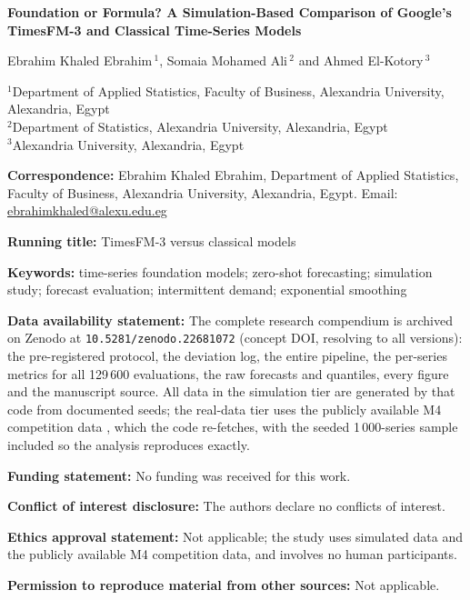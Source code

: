 \documentclass[11pt]{article}
\newcommand{\code}[1]{\texttt{#1}}
\begin{document}
\begin{titlepage}
\begin{center}
{\LARGE\bfseries Foundation or Formula? A Simulation-Based Comparison of Google's TimesFM-3 and
Classical Time-Series Models\par}
\vspace{1.5em}
{\large Ebrahim Khaled Ebrahim\,$^{1}$,
Somaia Mohamed Ali\,$^{2}$ and
Ahmed El-Kotory\,$^{3}$\par}
\vspace{1em}
{\small $^{1}$Department of Applied Statistics, Faculty of Business, Alexandria University,
Alexandria, Egypt\\
$^{2}$Department of Statistics, Alexandria University, Alexandria, Egypt\\
$^{3}$Alexandria University, Alexandria, Egypt\par}
\end{center}

\vspace{1.5em}
\noindent\textbf{Correspondence:} Ebrahim Khaled Ebrahim, Department of Applied Statistics,
Faculty of Business, Alexandria University, Alexandria, Egypt.
Email: \href{mailto:ebrahimkhaled@alexu.edu.eg}{ebrahimkhaled@alexu.edu.eg}

\medskip
\noindent\textbf{Running title:} TimesFM-3 versus classical models

\medskip
\noindent\textbf{Keywords:} time-series foundation models; zero-shot forecasting; simulation
study; forecast evaluation; intermittent demand; exponential smoothing

\medskip
\noindent\textbf{Data availability statement:} The complete research compendium is archived on Zenodo at \code{10.5281/zenodo.22681072} (concept DOI, resolving to all versions): the pre-registered protocol, the deviation log, the entire pipeline, the per-series metrics for all 129\,600 evaluations, the raw forecasts and quantiles, every figure and the manuscript source. All data in the simulation tier are generated by that code from documented seeds; the real-data tier uses the publicly available M4 competition data \citep{makridakis2020m4}, which the code re-fetches, with the seeded 1\,000-series sample included so the analysis reproduces exactly.

\medskip
\noindent\textbf{Funding statement:} No funding was received for this work.

\medskip
\noindent\textbf{Conflict of interest disclosure:} The authors declare no conflicts of interest.

\medskip
\noindent\textbf{Ethics approval statement:} Not applicable; the study uses simulated data and
the publicly available M4 competition data, and involves no human participants.

\medskip
\noindent\textbf{Permission to reproduce material from other sources:} Not applicable.
\end{titlepage}
\end{document}
